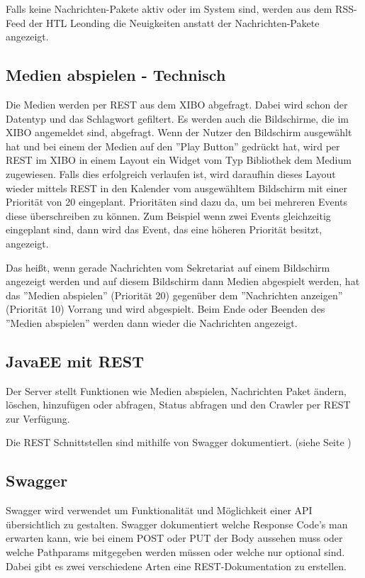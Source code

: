 Falls keine Nachrichten-Pakete aktiv oder im System sind, werden aus dem RSS-Feed der HTL Leonding die Neuigkeiten anstatt der Nachrichten-Pakete angezeigt.

\subsection{Medien abspielen - Technisch}\label{sec:playmediatechnical}
Die Medien werden per REST aus dem XIBO abgefragt. Dabei wird schon der Datentyp und das Schlagwort gefiltert. Es werden auch die Bildschirme, die im XIBO angemeldet sind, abgefragt. Wenn der Nutzer den Bildschirm ausgewählt hat und bei einem der Medien auf den ''Play Button'' gedrückt hat, wird per REST im XIBO in einem Layout ein Widget vom Typ Bibliothek dem Medium zugewiesen. Falls dies erfolgreich verlaufen ist, wird daraufhin dieses Layout wieder mittels REST in den Kalender vom ausgewähltem Bildschirm mit einer Priorität von 20 eingeplant. Prioritäten sind dazu da, um bei mehreren Events diese überschreiben zu können. Zum Beispiel wenn zwei Events gleichzeitig eingeplant sind, dann wird das Event, das eine höheren Priorität besitzt, angezeigt.

Das heißt, wenn gerade Nachrichten vom Sekretariat auf einem Bildschirm angezeigt werden und auf diesem Bildschirm dann Medien abgespielt werden, hat das ''Medien abspielen'' (Priorität 20) gegenüber dem ''Nachrichten anzeigen'' (Priorität 10) Vorrang und wird abgespielt. Beim Ende oder Beenden des ''Medien abspielen'' werden dann wieder die Nachrichten angezeigt.

\subsection{JavaEE mit REST}\label{sec:javaeeresttechnical}
Der Server stellt Funktionen wie Medien abspielen, Nachrichten Paket ändern, löschen, hinzufügen oder abfragen, Status abfragen und den Crawler per REST zur Verfügung.

Die REST Schnittstellen sind mithilfe von Swagger dokumentiert. (siehe Seite \pageref{sec:javaeeandroidrestswagger})

\subsection{Swagger}\label{sec:javaeeandroidrestswagger}
Swagger wird verwendet um Funktionalität und Möglichkeit einer API übersichtlich zu gestalten. Swagger dokumentiert welche Response Code's man erwarten kann, wie bei einem POST oder PUT der Body aussehen muss oder welche Pathparams mitgegeben werden müssen oder welche nur optional sind. Dabei gibt es zwei verschiedene Arten eine REST-Dokumentation zu erstellen.

